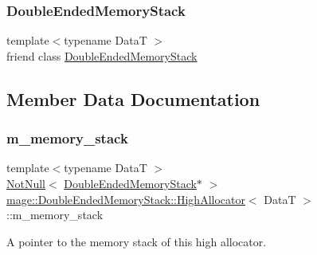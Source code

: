 \subsubsection{\texorpdfstring{Double\+Ended\+Memory\+Stack}{DoubleEndedMemoryStack}}
{\footnotesize\ttfamily template$<$typename DataT $>$ \\
friend class \mbox{\hyperlink{classmage_1_1_double_ended_memory_stack}{Double\+Ended\+Memory\+Stack}}\hspace{0.3cm}{\ttfamily [friend]}}



\subsection{Member Data Documentation}
\mbox{\label{classmage_1_1_double_ended_memory_stack_1_1_high_allocator_a5210ee9e229a0d91fc159ea3abb5fcbf}} 
\subsubsection{\texorpdfstring{m\+\_\+memory\+\_\+stack}{m\_memory\_stack}}
{\footnotesize\ttfamily template$<$typename DataT $>$ \\
\mbox{\hyperlink{namespacemage_a8769f9d670d6b585ea306cb1062af94b}{Not\+Null}}$<$ \mbox{\hyperlink{classmage_1_1_double_ended_memory_stack}{Double\+Ended\+Memory\+Stack}}$\ast$ $>$ \mbox{\hyperlink{classmage_1_1_double_ended_memory_stack_1_1_high_allocator}{mage\+::\+Double\+Ended\+Memory\+Stack\+::\+High\+Allocator}}$<$ DataT $>$\+::m\+\_\+memory\+\_\+stack\hspace{0.3cm}{\ttfamily [private]}}

A pointer to the memory stack of this high allocator. 